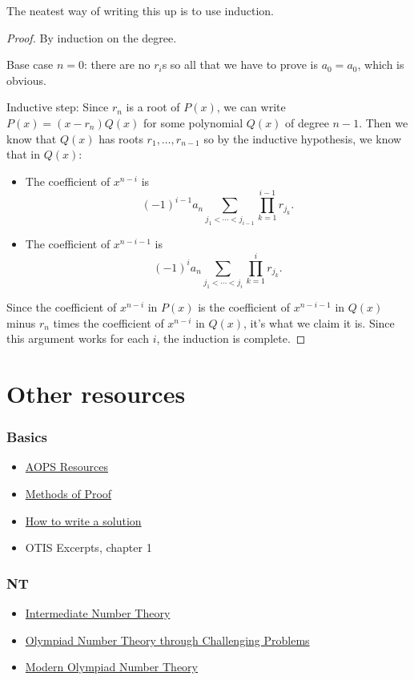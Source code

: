 \documentclass{amsart}
\begin{document}
The neatest way of writing this up is to use induction.
\begin{proof}
  By induction on the degree.

  Base case $n=0$: there are no $r_i$s so all that
  we have to prove is $a_0=a_0$, which is obvious.

  Inductive step: Since $r_n$ is a root of $P(x)$, we can write
  $P(x)=(x-r_n)Q(x)$ for some polynomial $Q(x)$ of degree $n-1$. Then we know
  that $Q(x)$ has roots $r_1,\ldots,r_{n-1}$ so by the inductive hypothesis, we
  know that in $Q(x)$:
  \begin{itemize}
    \item The coefficient of $x^{n-i}$ is
      \[(-1)^{i-1}a_n\sum_{j_1<\cdots<j_{i-1}}\prod_{k=1}^{i-1}r_{j_k}.\]
    \item The coefficient of $x^{n-i-1}$ is
      \[(-1)^{i}a_n\sum_{j_1<\cdots<j_i}\prod_{k=1}^i r_{j_k}.\]
  \end{itemize}
  Since the coefficient of $x^{n-i}$ in $P(x)$ is the coefficient of $x^{n-i-1}$
  in $Q(x)$ minus $r_n$ times the coefficient of $x^{n-i}$ in $Q(x)$, it's what
  we claim it is. Since this argument works for each $i$, the induction is
  complete.
\end{proof}
\newpage
\part{Other resources}
\section{Basics}
\begin{itemize}
  \item \href{https://artofproblemsolving.com/resources}{AOPS Resources}
  \item
    \href{https://www.its.caltech.edu/~kpilch/olympiad/MethodsOfProof-Complete.pdf}
    {Methods of Proof}
  \item \href{https://artofproblemsolving.com/news/articles/how-to-write-a-solution}
    {How to write a solution}
  \item OTIS Excerpts, chapter 1
\end{itemize}

\section{NT}
\begin{itemize}
  \item
    \href{https://numbertheoryguydotcom.files.wordpress.com/2018/10/main1.pdf}
    {Intermediate Number Theory}
  \item
    \href{http://s3.amazonaws.com/aops-cdn.artofproblemsolving.com/resources/articles/olympiad-number-theory.pdf}
      {Olympiad Number Theory through Challenging Problems}
  \item \href{https://drive.google.com/file/d/1BcJTLjQaelZ4w_70oHKyImC2I8zLfyrt/view?usp=sharing}
    {Modern Olympiad Number Theory}
\end{itemize}
\end{document}
